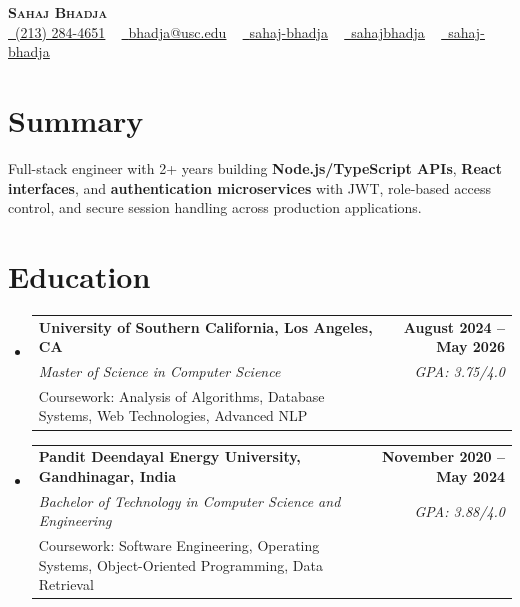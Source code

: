 \documentclass[letterpaper,10pt]{article}
\makeatletter
\newcommand{\resumeEduSubheading}[5]{\vspace{-1pt}\item\begin{tabular*}{1.0\textwidth}[t]{l@{\extracolsep{\fill}}r}\textbf{#1} & \textbf{\small #2} \\\textit{\small #3} & \textit{\small #4} \\\small #5 & \\\end{tabular*}\vspace{-4pt}}
\newcommand{\resumeSubHeadingListStart}{\begin{itemize}[leftmargin=0.0in, label={}]}
\newcommand{\resumeSubHeadingListEnd}{\end{itemize}}
\makeatother
\begin{document}
\begin{center}
{\Huge \scshape \textbf{Sahaj Bhadja}} \\ \vspace{1pt}
\small \href{tel:(213) 284-4651}{\faPhone\ \underline{(213) 284-4651}} ~ \href{mailto:bhadja@usc.edu}{\raisebox{-0.2\height}\faEnvelope\ \underline{bhadja@usc.edu}} ~
\href{https://www.linkedin.com/in/sahaj-bhadja/}{\raisebox{-0.2\height}\faLinkedin\ \underline{sahaj-bhadja}} ~ \href{https://github.com/SAHAJ-BHADJA}{\raisebox{-0.2\height}\faGithub\ \underline{sahajbhadja}} ~
\href{https://sahaj-bhadja.vercel.app/}{\raisebox{-0.2\height}\faGlobe\ \underline{sahaj-bhadja}}
\end{center}
\vspace{-18pt}
\section{Summary}
\begin{itemize}[leftmargin=0.15in, label={}]
\small{\item{Full-stack engineer with 2+ years building \textbf{Node.js/TypeScript APIs}, \textbf{React interfaces}, and \textbf{authentication microservices} with JWT, role-based access control, and secure session handling across production applications.}}
\end{itemize}
\vspace{-16pt}
\section{Education}
\resumeSubHeadingListStart
\resumeEduSubheading{University of Southern California, Los Angeles, CA}{August 2024 -- May 2026}{Master of Science in Computer Science}{GPA: 3.75/4.0}{Coursework: Analysis of Algorithms, Database Systems, Web Technologies, Advanced NLP}
\vspace{-9pt}
\resumeEduSubheading{Pandit Deendayal Energy University, Gandhinagar, India}{November 2020 -- May 2024}{Bachelor of Technology in Computer Science and Engineering}{GPA: 3.88/4.0}{Coursework: Software Engineering, Operating Systems, Object-Oriented Programming, Data Retrieval}
\resumeSubHeadingListEnd
\vspace{-14pt}
\end{document}
